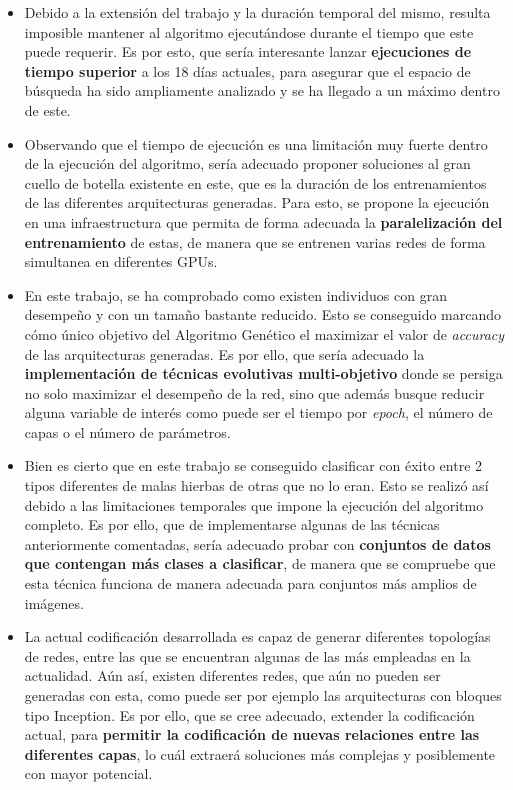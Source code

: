 \begin{itemize}
    \item Debido a la extensión del trabajo y la duración temporal del mismo, resulta imposible mantener al algoritmo ejecutándose durante el tiempo que este puede requerir. Es por esto, que sería interesante lanzar \textbf{ejecuciones de tiempo superior} a los 18 días actuales, para asegurar que el espacio de búsqueda ha sido ampliamente analizado y se ha llegado a un máximo dentro de este.
    
    \item Observando que el tiempo de ejecución es una limitación muy fuerte dentro de la ejecución del algoritmo, sería adecuado proponer soluciones al gran cuello de botella existente en este, que es la duración de los entrenamientos de las diferentes arquitecturas generadas. Para esto, se propone la ejecución en una infraestructura que permita de forma adecuada la \textbf{paralelización del entrenamiento} de estas, de manera que se entrenen varias redes de forma simultanea en diferentes GPUs.
    
    \item En este trabajo, se ha comprobado como existen individuos con gran desempeño y con un tamaño bastante reducido. Esto se conseguido marcando cómo único objetivo del Algoritmo Genético el maximizar el valor de \textit{accuracy} de las arquitecturas generadas. Es por ello, que sería adecuado la \textbf{implementación de técnicas evolutivas multi-objetivo} donde se persiga no solo maximizar el desempeño de la red, sino que además busque reducir alguna variable de interés como puede ser el tiempo por \textit{epoch}, el número de capas o el número de parámetros.
    
    \item Bien es cierto que en este trabajo se conseguido clasificar con éxito entre 2 tipos diferentes de malas hierbas de otras que no lo eran. Esto se realizó así debido a las limitaciones temporales que impone la ejecución del algoritmo completo. Es por ello, que de implementarse algunas de las técnicas anteriormente comentadas, sería adecuado probar con \textbf{conjuntos de datos que contengan más clases a clasificar}, de manera que se compruebe que esta técnica funciona de manera adecuada para conjuntos más amplios de imágenes.
    
    \item La actual codificación desarrollada es capaz de generar diferentes topologías de redes, entre las que se encuentran algunas de las más empleadas en la actualidad. Aún así, existen diferentes redes, que aún no pueden ser generadas con esta, como puede ser por ejemplo las arquitecturas con bloques tipo Inception. Es por ello, que se cree adecuado, extender la codificación actual, para \textbf{permitir la codificación de nuevas relaciones entre las diferentes capas}, lo cuál extraerá soluciones más complejas y posiblemente con mayor potencial.
    
\end{itemize}

